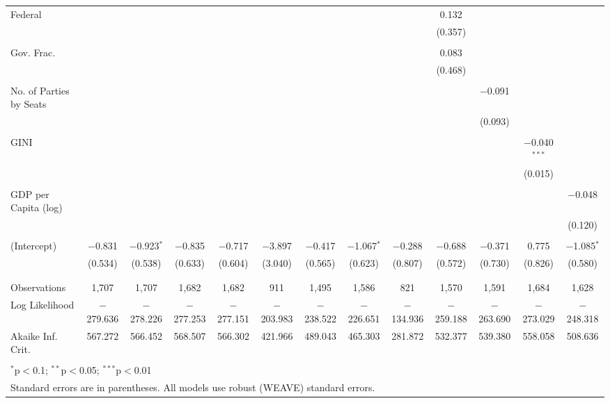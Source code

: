 \documentclass[a4paper]{article}\usepackage[]{graphicx}\usepackage[]{color}
\begin{document}
\begin{table}[H]
\begin{center}
{{\begin{tabular}{@{\extracolsep{5pt}}lcccccccccccc}
 Federal &  &  &  &  &  &  &  &  & 0.132 &  &  &  \\ 
  &  &  &  &  &  &  &  &  & (0.357) &  &  &  \\ 
  & & & & & & & & & & & & \\ 
 Gov. Frac. &  &  &  &  &  &  &  &  & 0.083 &  &  &  \\ 
  &  &  &  &  &  &  &  &  & (0.468) &  &  &  \\ 
  & & & & & & & & & & & & \\ 
 No. of Parties by Seats &  &  &  &  &  &  &  &  &  & $-$0.091 &  &  \\ 
  &  &  &  &  &  &  &  &  &  & (0.093) &  &  \\ 
  & & & & & & & & & & & & \\ 
 GINI &  &  &  &  &  &  &  &  &  &  & $-$0.040$^{***}$ &  \\ 
  &  &  &  &  &  &  &  &  &  &  & (0.015) &  \\ 
  & & & & & & & & & & & & \\ 
 GDP per Capita (log) &  &  &  &  &  &  &  &  &  &  &  & $-$0.048 \\ 
  &  &  &  &  &  &  &  &  &  &  &  & (0.120) \\ 
  & & & & & & & & & & & & \\ 
 (Intercept) & $-$0.831 & $-$0.923$^{*}$ & $-$0.835 & $-$0.717 & $-$3.897 & $-$0.417 & $-$1.067$^{*}$ & $-$0.288 & $-$0.688 & $-$0.371 & 0.775 & $-$1.085$^{*}$ \\ 
  & (0.534) & (0.538) & (0.633) & (0.604) & (3.040) & (0.565) & (0.623) & (0.807) & (0.572) & (0.730) & (0.826) & (0.580) \\ 
  & & & & & & & & & & & & \\ 
\hline \\[-1.8ex] 
Observations & 1,707 & 1,707 & 1,682 & 1,682 & 911 & 1,495 & 1,586 & 821 & 1,570 & 1,591 & 1,684 & 1,628 \\ 
Log Likelihood & $-$279.636 & $-$278.226 & $-$277.253 & $-$277.151 & $-$203.983 & $-$238.522 & $-$226.651 & $-$134.936 & $-$259.188 & $-$263.690 & $-$273.029 & $-$248.318 \\ 
Akaike Inf. Crit. & 567.272 & 566.452 & 568.507 & 566.302 & 421.966 & 489.043 & 465.303 & 281.872 & 532.377 & 539.380 & 558.058 & 508.636 \\ 
\hline 
\hline \\[-1.8ex] 
\multicolumn{13}{l}{$^{*}$p$<$0.1; $^{**}$p$<$0.05; $^{***}$p$<$0.01} \\ 
\multicolumn{13}{l}{Standard errors are in parentheses. All models use robust (WEAVE) standard errors.} \\ 
\end{tabular} 

}}
\end{center}

\end{table}
\end{document}
